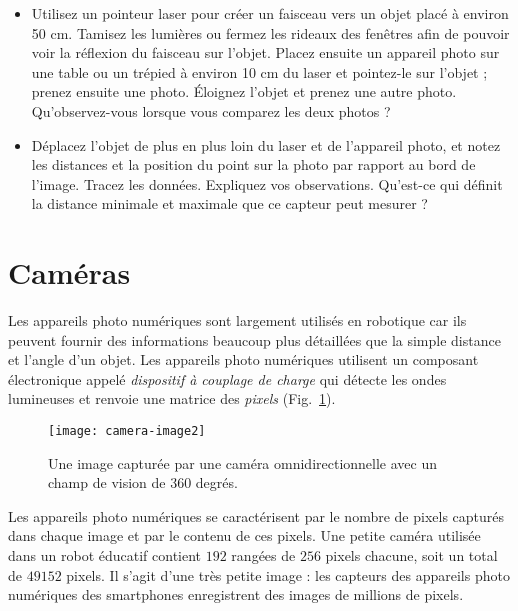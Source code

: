 \begin{framed}

\begin{itemize}
\item Utilisez un pointeur laser pour créer un faisceau vers un objet placé à environ 50 cm. Tamisez les lumières ou fermez les rideaux des fenêtres afin de pouvoir voir la réflexion du faisceau sur l'objet. Placez ensuite un appareil photo sur une table ou un trépied à environ 10 cm du laser et pointez-le sur l'objet ; prenez ensuite une photo. Éloignez l'objet et prenez une autre photo. Qu'observez-vous lorsque vous comparez les deux photos ?
\item Déplacez l'objet de plus en plus loin du laser et de l'appareil photo, et notez les distances et la position du point sur la photo par rapport au bord de l'image. Tracez les données. Expliquez vos observations. Qu'est-ce qui définit la distance minimale et maximale que ce capteur peut mesurer ?
\end{itemize}
\end{framed}

\section{Caméras}\label{s.cameras}

Les appareils photo numériques sont largement utilisés en robotique car ils peuvent fournir des informations beaucoup plus détaillées que la simple distance et l'angle d'un objet. Les appareils photo numériques utilisent un composant électronique appelé \emph{dispositif à couplage de charge} qui détecte les ondes lumineuses et renvoie une matrice des \emph{pixels} (Fig.~\ref{fig.camera}).

\begin{figure}
\texttt{[image: camera-image2]}
\caption{Une image capturée par une caméra omnidirectionnelle avec un champ de vision de 360 degrés.}\label{fig.camera}
\end{figure}

Les appareils photo numériques se caractérisent par le nombre de pixels capturés dans chaque image et par le contenu de ces pixels. Une petite caméra utilisée dans un robot éducatif contient $192$ rangées de $256$ pixels chacune, soit un total de $49 152$ pixels. Il s'agit d'une très petite image : les capteurs des appareils photo numériques des smartphones enregistrent des images de millions de pixels.

